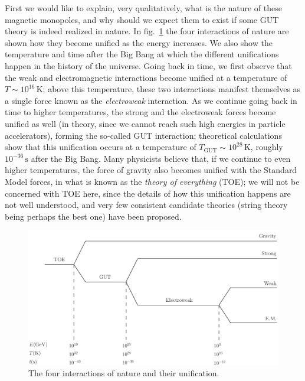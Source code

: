 First we would like to explain, very qualitatively, what is the nature of these magnetic monopoles, and why should we expect them to exist if some GUT theory is indeed realized in nature. In fig.\ \ref{fig:lec12_5} the four interactions of nature are shown how they become unified as the energy increases. We also show the temperature and time after the Big Bang at which the different unifications happen in the history of the universe. Going back in time, we first observe that the weak and electromagnetic interactions become unified at a temperature of $T\sim 10^{16}\,{\mathrm{K}}$; above this temperature, these two interactions manifest themselves as a single force known as the {\it electroweak} interaction. As we continue going back in time to higher temperatures, the strong and the electroweak forces become unified as well (in theory, since we cannot reach such high energies in particle accelerators), forming the so-called GUT interaction; theoretical calculations show that this unification occurs at a 
temperature of $T_{\mathrm{GUT}}\sim 10^{28}\,\mathrm{K}$, roughly $10^{-36}\,\mathrm{s}$ after the Big Bang. Many physicists believe that, if we continue to even higher temperatures, the force of gravity also becomes unified with the Standard Model forces, in what is known as the {\it theory of everything} (TOE); we will not be concerned with TOE here, since the details of how this unification happens are not well understood, and very few consistent candidate theories (string theory being perhaps the best one) have been proposed.
\begin{figure}[ht]
\begin{center}
\includegraphics[scale=0.55]{Draw/lec12_5.png}
\end{center}
\caption{The four interactions of nature and their unification.}
\label{fig:lec12_5}
\end{figure}

